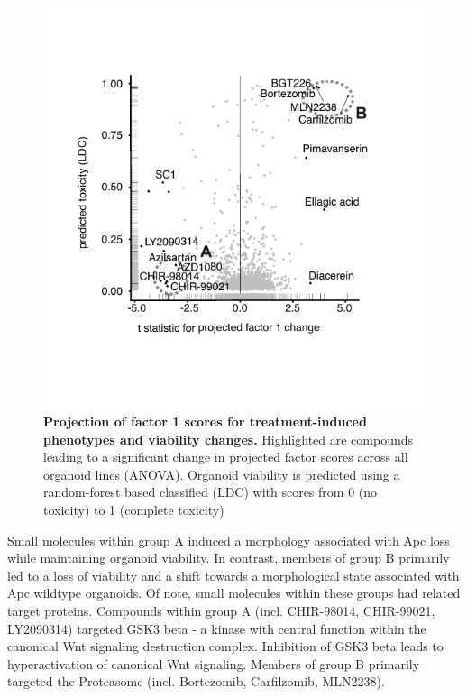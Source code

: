 \begin{flushleft}
\begin{figure}[h]
\centering
\includegraphics[scale=0.75,
                keepaspectratio]{figures/adenomaprofiling/pdf/fig_2_3.pdf}
\caption{\textbf{Projection of factor 1 scores for treatment-induced phenotypes and viability changes.} Highlighted are compounds leading to a significant change in projected factor scores across all organoid lines (ANOVA). Organoid viability is predicted using a random-forest based classified (LDC) with scores from 0 (no toxicity) to 1 (complete toxicity)}
\label{fig_180}
\end{figure}
\bigbreak

Small molecules within group A induced a morphology associated with Apc loss while maintaining organoid viability. In contrast, members of group B primarily led to a loss of viability and a shift towards a morphological state associated with Apc wildtype organoids. Of note, small molecules within these groups had related target proteins. Compounds within group A (incl. CHIR-98014, CHIR-99021, LY2090314) targeted GSK3 beta - a kinase with central function within the canonical Wnt signaling destruction complex. Inhibition of GSK3 beta leads to hyperactivation of canonical Wnt signaling.
Members of group B primarily targeted the Proteasome (incl. Bortezomib, Carfilzomib, MLN2238).


\end{flushleft}
